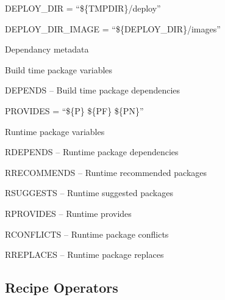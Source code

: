\begin{DoxyItemize}
\begin{DoxyItemize}
\item D\+E\+P\+L\+O\+Y\+\_\+\+D\+IR = “\$\{T\+M\+P\+D\+IR\}/deploy”
\item D\+E\+P\+L\+O\+Y\+\_\+\+D\+I\+R\+\_\+\+I\+M\+A\+GE = “\$\{D\+E\+P\+L\+O\+Y\+\_\+\+D\+IR\}/images”
\end{DoxyItemize}
\item Dependancy metadata
\begin{DoxyItemize}
\item Build time package variables
\begin{DoxyItemize}
\item D\+E\+P\+E\+N\+DS – Build time package dependencies
\item P\+R\+O\+V\+I\+D\+ES = “\$\{P\} \$\{PF\} \$\{PN\}”
\end{DoxyItemize}
\item Runtime package variables
\begin{DoxyItemize}
\item R\+D\+E\+P\+E\+N\+DS – Runtime package dependencies
\item R\+R\+E\+C\+O\+M\+M\+E\+N\+DS – Runtime recommended packages
\item R\+S\+U\+G\+G\+E\+S\+TS – Runtime suggested packages
\item R\+P\+R\+O\+V\+I\+D\+ES – Runtime provides
\item R\+C\+O\+N\+F\+L\+I\+C\+TS – Runtime package conflicts
\item R\+R\+E\+P\+L\+A\+C\+ES – Runtime package replaces
\end{DoxyItemize}
\end{DoxyItemize}
\end{DoxyItemize}

\subsection*{Recipe Operators}


